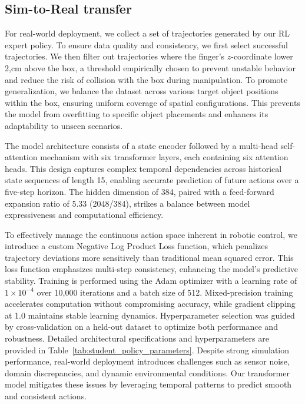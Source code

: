 \subsection{Sim-to-Real transfer}\label{appendix:sim_real_transfer}
For real-world deployment, we collect a set of trajectories generated by our RL expert policy. To ensure data quality and consistency, we first select successful trajectories. We then filter out trajectories where the finger's $z$-coordinate lower 2,cm above the box, a threshold empirically chosen to prevent unstable behavior and reduce the risk of collision with the box during manipulation. To promote generalization, we balance the dataset across various target object positions within the box, ensuring uniform coverage of spatial configurations. This prevents the model from overfitting to specific object placements and enhances its adaptability to unseen scenarios. 

The model architecture consists of a state encoder followed by a multi-head self-attention mechanism with six transformer layers, each containing six attention heads. This design captures complex temporal dependencies across historical state sequences of length 15, enabling accurate prediction of future actions over a five-step horizon. The hidden dimension of 384, paired with a feed-forward expansion ratio of 5.33 (2048/384), strikes a balance between model expressiveness and computational efficiency.

To effectively manage the continuous action space inherent in robotic control, we introduce a custom Negative Log Product Loss function, which penalizes trajectory deviations more sensitively than traditional mean squared error. This loss function emphasizes multi-step consistency, enhancing the model’s predictive stability. Training is performed using the Adam optimizer with a learning rate of $1 \times 10^{-4}$ over 10,000 iterations and a batch size of 512. Mixed-precision training accelerates computation without compromising accuracy, while gradient clipping at 1.0 maintains stable learning dynamics. Hyperparameter selection was guided by cross-validation on a held-out dataset to optimize both performance and robustness. Detailed architectural specifications and hyperparameters are provided in Table~\ref{tab:student_policy_parameters}. Despite strong simulation performance, real-world deployment introduces challenges such as sensor noise, domain discrepancies, and dynamic environmental conditions. Our transformer model mitigates these issues by leveraging temporal patterns to predict smooth and consistent actions. 


